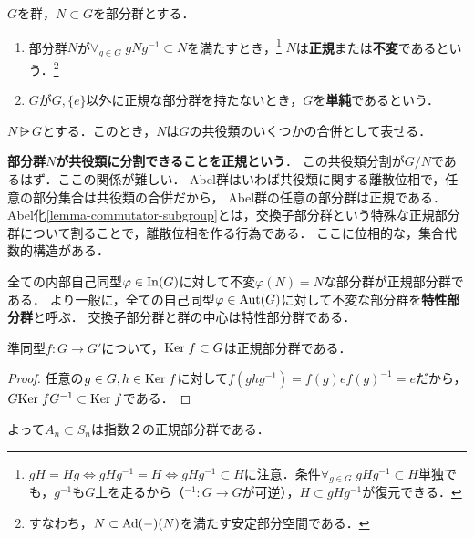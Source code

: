 \documentclass[uplatex,dvipdfmx]{jsreport}
\begin{document}
\begin{definition}
    $G$を群，$N\subset G$を部分群とする．
    \begin{enumerate}
        \item 部分群$N$が$\forall_{g\in G}\; gNg^{-1}\subset N$を満たすとき，\footnote{$gH=Hg\Leftrightarrow gHg^{-1}=H\Leftrightarrow gHg^{-1}\subset H$に注意．条件$\forall_{g\in G}\;gHg^{-1}\subset H$単独でも，$g^{-1}$も$G$上を走るから（${}^{-1}:G\to G$が可逆），$H\subset gHg^{-1}$が復元できる．}
        $N$は\textbf{正規}または\textbf{不変}であるという．\footnote{すなわち，$N\subset\mathrm{Ad}(-)(N)$を満たす安定部分空間である．}
        \item $G$が$G,\{e\}$以外に正規な部分群を持たないとき，$G$を\textbf{単純}であるという．
    \end{enumerate}
\end{definition}
\begin{lemma}[正規性のイメージ]
    $N\rsub G$とする．このとき，$N$は$G$の共役類のいくつかの合併として表せる．
\end{lemma}
\begin{remarks}
    \textbf{部分群$N$が共役類に分割できることを正規という}．
    この共役類分割が$G/N$であるはず．ここの関係が難しい．
    Abel群はいわば共役類に関する離散位相で，任意の部分集合は共役類の合併だから，
    Abel群の任意の部分群は正規である．
    Abel化\ref{lemma-commutator-subgroup}とは，交換子部分群という特殊な正規部分群について割ることで，離散位相を作る行為である．
    ここに位相的な，集合代数的構造がある．
\end{remarks}
\begin{remark}
    全ての内部自己同型$\varphi\in\mathrm{In}(G)$に対して不変$\varphi(N)=N$な部分群が正規部分群である．
    より一般に，全ての自己同型$\varphi\in\mathrm{Aut}(G)$に対して不変な部分群を\textbf{特性部分群}と呼ぶ．
    交換子部分群と群の中心は特性部分群である．
\end{remark}

\begin{proposition}[核は正規]
    準同型$f:G\to G'$について，$\mathrm{Ker}\; f\subset G$は正規部分群である．
\end{proposition}
\begin{proof}
    任意の$g\in G,h\in\mathrm{Ker}\; f$に対して$f(ghg^{-1})=f(g)ef(g)^{-1}=e$だから，$G\mathrm{Ker}\; fG^{-1}\subset\mathrm{Ker}\; f$である．
\end{proof}
\begin{remarks}\label{exp-normal-subgroup-of-S3}
    よって$A_n\subset S_n$は指数２の正規部分群である．
\end{remarks}
\end{document}
